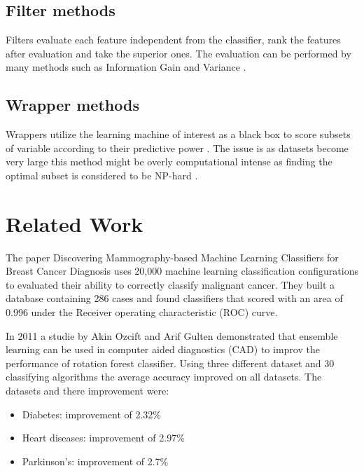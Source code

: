 \documentclass{kththesis}
\begin{document}
\subsection{Filter methods}

Filters evaluate each feature independent from the classifier, rank the features after evaluation and take the superior ones. The evaluation can be performed by many methods such as Information Gain and Variance \parencite{guyon2003}.

\subsection{Wrapper methods}

Wrappers utilize the learning machine of interest as a black box to score subsets of variable according to their predictive power \parencite{guyon2003}. The issue is as datasets become very large this method might be overly computational intense as finding the optimal subset is considered to be NP-hard \parencite{amaldi1998}.

\section{Related Work}

The paper Discovering Mammography-based Machine Learning Classifiers for Breast Cancer Diagnosis \parencite{ramos2012} uses 20,000 machine learning classification configurations to evaluated their ability to correctly classify malignant cancer. They built a database containing 286 cases and found classifiers that scored with an area of 0.996 under the Receiver operating characteristic (ROC) curve.



In 2011 a studie by Akin Ozcift and Arif Gulten \parencite{akin2011} demonstrated that ensemble learning can be used in computer aided diagnostics (CAD) to improv the performance of rotation forest classifier. Using three different dataset and 30 classifying algorithms the average accuracy improved on all datasets. The datasets and there improvement were:

\begin{itemize}
  \item Diabetes: improvement of 2.32\%
  \item Heart diseases: improvement of 2.97\%
  \item Parkinson's: improvement of 2.7\%
\end{itemize}
\end{document}
